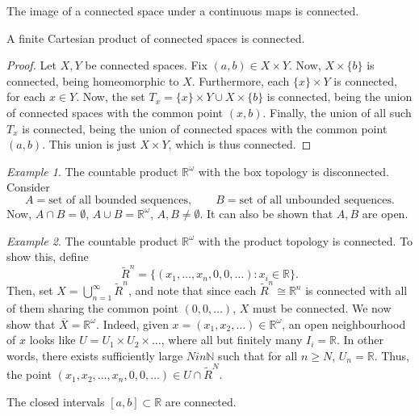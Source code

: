 \documentclass[11pt]{article}
\newcommand{\R}{\mathbb{R}}
\newcommand{\N}{\mathbb{N}}
\theoremstyle{definition}
\theoremstyle{remark}
\newtheorem*{example}{Example}
\numberwithin{equation}{section}
\begin{document}
    \begin{theorem}
        The image of a connected space under a continuous maps is connected.
    \end{theorem}

    \begin{theorem}
        A finite Cartesian product of connected spaces is connected.
    \end{theorem}
    \begin{proof}
        Let $X, Y$ be connected spaces. Fix $(a, b) \in X \times Y$. Now, $X\times
        \{b\}$ is connected, being homeomorphic to $X$. Furthermore, each $\{x\}
        \times Y$ is connected, for each $x \in Y$. Now, the set $T_x = \{x\} \times
        Y \cup X\times \{b\}$ is connected, being the union of connected spaces with
        the common point $(x, b)$. Finally, the union of all such $T_x$ is connected,
        being the union of connected spaces with the common point $(a, b)$. This
        union is just $X\times Y$, which is thus connected.
    \end{proof}
    \begin{example}
        The countable product $\R^\omega$ with the box topology is disconnected.
        Consider \[
            A = \text{set of all bounded sequences}, \qquad
            B = \text{set of all unbounded sequences}.
        \] Now, $A \cap B = \emptyset$, $A\cup B = \R^\omega$, $A, B \neq \emptyset$.
        It can also be shown that $A, B$ are open.
    \end{example}
    \begin{example}
        The countable product $\R^\omega$ with the product topology is connected. To
        show this, define \[
            \tilde{R}^n = \{(x_1, \dots, x_n, 0, 0, \dots): x_i \in \R\}.
        \] Then, set $X = \bigcup_{n = 1}^\infty \tilde{R}^n$, and note that since
        each $\tilde{R}^n \cong \R^n$ is connected with all of them sharing the
        common point $(0, 0, \dots)$, $X$ must be connected. We now show that
        $\overline{X} = \R^\omega$. Indeed, given $x = (x_1, x_2, \dots) \in \R^\omega$,
        an open neighbourhood of $x$ looks like $U = U_1 \times U_2 \times \dots$,
        where all but finitely many $I_i = \R$. In other words, there exists
        sufficiently large $N in \N$ such that for all $n \geq N$, $U_n = \R$. Thus,
        the point $(x_1, x_2, \dots, x_n, 0, 0, \dots) \in U \cap \tilde{R}^N$.
    \end{example}

    \begin{lemma}
        The closed intervals $[a, b] \subset \R$ are connected.
    \end{lemma}
\end{document}
